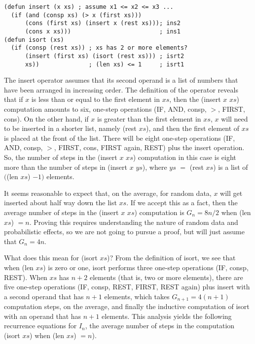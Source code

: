 \label{defun:insert-isort-copy}
\begin{Verbatim}
(defun insert (x xs) ; assume x1 <= x2 <= x3 ...
  (if (and (consp xs) (> x (first xs)))
      (cons (first xs) (insert x (rest xs))); ins2
      (cons x xs)))                         ; ins1
(defun isort (xs)
  (if (consp (rest xs)) ; xs has 2 or more elements?
      (insert (first xs) (isort (rest xs))) ; isrt2
      xs))              ; (len xs) <= 1     ; isrt1
\end{Verbatim}

The insert operator assumes that its second operand
is a list of numbers that have been arranged in increasing order.
The definition of the operator reveals that
if $x$ is less than or equal to the first element in $xs$,
then the  (insert $x$ $xs$)
computation amounts to six, one-step operations
(IF, AND, consp, $>$, FIRST, cons).
On the other hand, if $x$ is greater than the first
element in $xs$,
$x$ will need to be inserted in a shorter list,
namely (rest $xs$), and then the first element of $xs$
is placed at the front of the list.
There will be eight one-step operations
(IF, AND, consp, $>$, FIRST, cons, FIRST again, REST)
plus the insert operation.
So, the number of steps in the (insert $x$ $xs$)
computation in this case is eight more than the number of
steps in (insert $x$ $ys$), where $ys$ $=$ (rest $xs$)
is a list of $($(len $xs$) $- 1)$ elements.

It seems reasonable to expect that, on the average,
for random data, $x$ will get inserted about
half way down the list $xs$.
If we accept this as a fact, then the average
number of steps in the (insert $x$ $xs$) computation is
$G_n = 8n/2$ when (len $xs$) $= n$.
Proving this requires understanding the nature of random
data and probabilistic effects, so we are not going
to pursue a proof, but will just assume that
$G_n = 4n$.

What does this mean for (isort $xs$)?
From the definition of isort, we see that when (len $xs$) is zero or one,
isort performs three one-step operations (IF, consp, REST).
When $xs$ has $n+2$ elements (that is, two or more elements),
there are five one-step operations
(IF, consp, REST, FIRST, REST again)
plus insert with a second operand that has $n+1$ elements,
which takes $G_{n+1} = 4(n+1)$ computation steps,
on the average, and finally the inductive computation of isort
with an operand that has $n+1$ elements.
This analysis yields the following recurrence equations for $I_n$,
the average number of steps in the computation (isort $xs$) when (len $xs$) $= n$).


